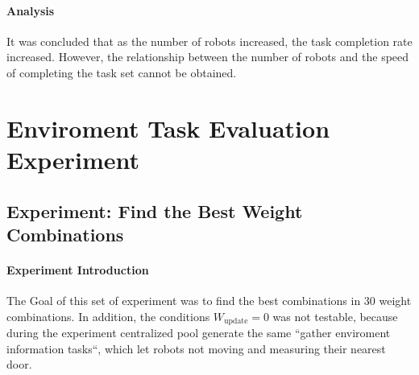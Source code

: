 \paragraph{Analysis} It was concluded that as the number of robots increased, the task completion rate increased. However, the relationship between the number of robots and the speed of completing the task set cannot be obtained.

\begin{table}[htb]
\centering
{}
\caption{Result 4: Different number of robot processing the same task set}
\label{tab:exp_robot_number}
\end{table}


\section{Enviroment Task Evaluation Experiment}


\subsection{Experiment: Find the Best Weight Combinations}

\paragraph{Experiment Introduction} The Goal of this set of experiment was to find the best combinations in 30 weight combinations. In addition, the conditions $W_{\mbox{update}}=0$ was not testable, because during the experiment centralized pool generate the same ``gather enviroment information tasks``, which let robots not moving and measuring their nearest door.

